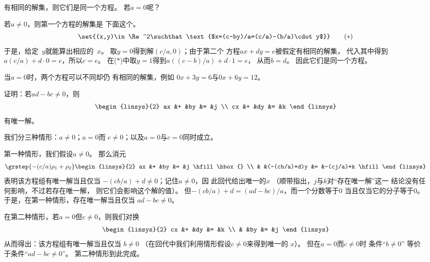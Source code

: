 \begin{exercises}
    有相同的解集，则它们是同一个方程。
    若\( a=0 \)呢？
    \begin{answer}
      若\( a\neq 0 \)，则第一个方程的解集是
      下面这个。
      \begin{equation*}
        \set{(x,y)\in\Re^2\suchthat 
             \text{$x=(c-by)/a=(c/a)-(b/a)\cdot y$}}
        \tag{$*$} 
      \end{equation*}
      于是，给定~$y$就能算出相应的~$x$。
      取$y=0$得到解$(c/a,0)$；由于第二个
      方程$ax+dy=e$被假定有相同的解集，
      代入其中得到$a(c/a)+d\cdot 0=e$，所以$c=e$。
      在($*$)中取$y=1$得到$a((c-b)/a)+d\cdot 1=e$，
      从而$b=d$。
      因此它们是同一个方程。

      当\( a=0 \)时，两个方程可以不同却仍
      有相同的解集，例如
      \( 0x+3y=6 \)与\( 0x+6y=12 \)。   
     \end{answer}
  \item 
    证明：若\( ad-bc\neq 0 \)，则
    \begin{equation*}
      \begin{linsys}{2}
        ax  &+  &by  &=  &j  \\
        cx  &+  &dy  &=  &k  
      \end{linsys}
    \end{equation*}
    有唯一解。
    \begin{answer}
      我们分三种情形：$a\neq 0$；$a=0$而
      $c\neq 0$；以及$a=0$与$c=0$同时成立。

      第一种情形，我们假设\( a\neq 0 \)。
      那么消元
      \begin{equation*}
        \grstep{-(c/a)\rho_1+\rho_2}
        \begin{linsys}{2}
          ax  &+  &by                  &=  &j \hfill\hbox{} \\
              &   &(-(cb/a)+d)y  &=  &-(cj/a)+k \hfill  
         \end{linsys}
      \end{equation*}
      表明该方程组有唯一解当且仅当
      \( -(cb/a)+d\neq 0   \)；记住\( a\neq 0 \)，因
      此回代给出唯一的\( x \)
      （顺带指出，\( j \)与\( k \)对“存在唯一解”这一
      结论没有任何影响，不过若存在唯一解，
      则它们会影响这个解的值）。
      但\( -(cb/a)+d = (ad-bc)/a \)，而一个分数等于\( 0 \)
      当且仅当它的分子等于\( 0 \)。
      于是，在第一种情形，存在唯一解当且仅当
      $ad-bc\neq 0$。

      在第二种情形，若\( a=0 \)但\( c\neq 0 \)，则我们对换
      \begin{equation*}
        \begin{linsys}{2}
          cx  &+  &dy  &=  &k  \\
              &   &by  &=  &j  
        \end{linsys}
      \end{equation*}
      从而得出：该方程组有唯一解当且仅当
      \( b\neq 0 \)
      （在回代中我们利用情形假设\( c\neq 0 \)来得到唯一的
      \( x \)）。
      但\Dash 在\( a=0 \)而\( c\neq 0 \)时\Dash
      条件“\( b\neq 0 \)”
      等价于条件“\( ad-bc\neq 0 \)”。
      第二种情形到此完成。


\end{answer}
\end{exercises}
